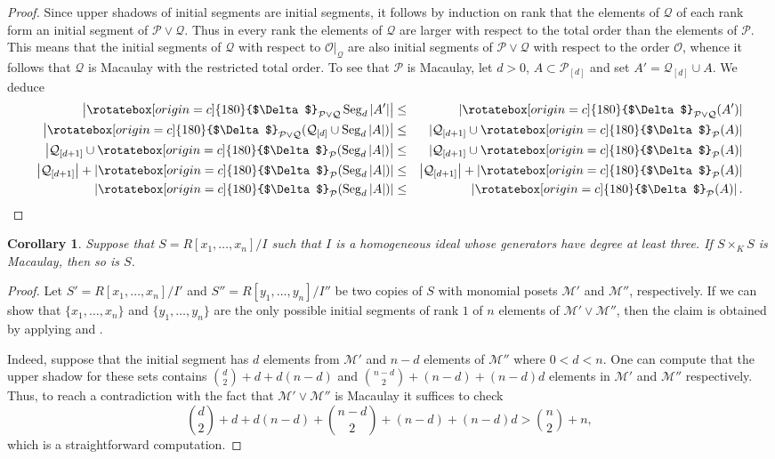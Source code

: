 \documentclass[11pt, reqno]{amsart}
\newcommand{\Q}{{\mathcal Q}}
\newcommand{\M}{{\mathcal M}}
\renewcommand{\P}{{\mathcal P}}
\newcommand{\uSdw}{\rotatebox[origin=c]{180}{$\Delta$}}
\def\Seg{\operatorname{Seg}}
\theoremstyle{plain} %
\newtheorem{cor}[thm]{Corollary}
\theoremstyle{definition}
\theoremstyle{remark}
\numberwithin{equation}{section}  %
\begin{document}
\begin{proof}
Since upper shadows of initial segments are initial segments, it follows by induction on rank that the elements of $\Q$ of each rank form an initial segment of $\P\vee \Q$. Thus in every rank the elements of $\Q$ are larger with respect to the total order than the elements of $\P$. This means that the initial segments of $\Q$ with respect to $\mathcal{O}|_\Q$ are also initial segments of $\P\vee \Q$ with respect to the order $\mathcal{O}$, whence it follows that $\Q$ is Macaulay with the restricted total order. To see that $\P$ is Macaulay, let $d>0$, $A\subset \P_{[d]}$ and set $A'=\Q_{[d]}\cup A$. We deduce
\begin{eqnarray*}
\left | \uSdw_{\P\vee \Q}\Seg_d |A'|  \right | & \leq & |\uSdw_{\P\vee \Q}(A')|\\
 \left | \uSdw_{\P\vee \Q} (\Q_{[d]}\cup \Seg_d |A| )  \right | & \leq & |\Q_{[d+1]}\cup \uSdw_{\P}(A)|\\
  \left | \Q_{[d+1]}\cup  \uSdw_{\P}( \Seg_d |A| )  \right | & \leq & |\Q_{[d+1]}\cup \uSdw_{\P}(A)|\\
\left | \Q_{[d+1]} \right| +\left |  \uSdw_{\P}( \Seg_d |A| )  \right |  & \leq &\left | \Q_{[d+1]} \right| +\left |  \uSdw_{\P}(A) \right|\\
\left |  \uSdw_{\P}( \Seg_d |A| )  \right |  & \leq & \left |  \uSdw_{\P}(A) \right |.
\end{eqnarray*}
\end{proof}




\begin{cor} Suppose that $S=R[x_1,\ldots,x_n]/I$ such that $I$ is a homogeneous ideal whose generators have degree at least three. If $S\times _K S$ is Macaulay, then so is $S$.  
\end{cor}
\begin{proof} Let $S'=R[x_1,\ldots,x_n]/I'$ and $S''=R[y_1,\ldots,y_n]/I''$ be two copies of $S$ with monomial posets $\M'$ and $\M''$, respectively. If we can show that $\{x_1,\ldots,x_n\}$ and $\{y_1,\ldots,y_n\}$ are the only possible initial segments of rank $1$ of $n$ elements of $\M'\vee \M''$, then the claim is obtained by applying  and . 

Indeed, suppose that the initial segment has $d$ elements from $\M'$ and $n-d$ elements of $\M''$ where $0<d<n$. One can compute that the upper shadow for these sets contains $\binom{d}{2}+d+d(n-d)$ and $\binom{n-d}{2} + (n-d) + (n-d)d$ elements in $\M'$ and $\M''$ respectively. Thus, to reach a contradiction with the fact that $\M'\vee \M''$ is Macaulay it suffices to check 
$$\binom{d}{2}+d+d(n-d)+ \binom{n-d}{2} + (n-d) + (n-d)d > \binom{n}{2} + n, $$
which is a straightforward computation.
\end{proof}
\end{document}
